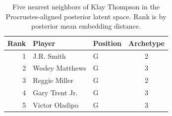 \begin{table}[htbp]
  \centering\small
  \begin{tabular}{rllc}
    \toprule
    Rank & Player & Position & Archetype \\
    \midrule
    1 & J.R. Smith & G & 2 \\
    2 & Wesley Matthews & G & 3 \\
    3 & Reggie Miller & G & 2 \\
    4 & Gary Trent Jr. & G & 3 \\
    5 & Victor Oladipo & G & 3 \\
    \bottomrule
  \end{tabular}
  \caption{Five nearest neighbors of Klay Thompson in the Procrustes-aligned posterior latent space. Rank is by posterior mean embedding distance.}
  \label{tab:Klay_Thompson_neighbors}
\end{table}

